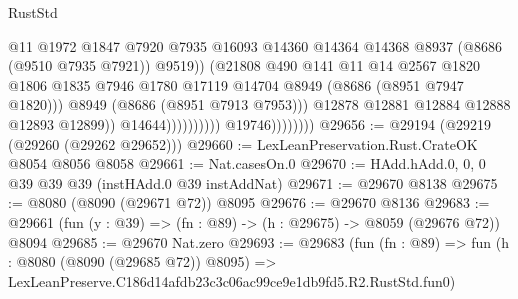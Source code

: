\begin{lexlean}{RustStd}
\begin{coremodule}
                                                  @11
                                                  @1972
                                                  @1847
                                                  @7920
                                                  @7935
                                                  @16093
                                                  @14360
                                                  @14364
                                                  @14368
                                                  @8937
                                                  (@8686 (@9510 @7935 @7921))
                                                  @9519))
                                              (@21808
                                                @490
                                                @141
                                                @11
                                                @14
                                                @2567
                                                @1820
                                                @1806
                                                @1835
                                                @7946
                                                @1780
                                                @17119
                                                @14704
                                                @8949
                                                (@8686 (@8951 @7947 @1820)))
                                              @8949
                                              (@8686 (@8951 @7913 @7953)))
                                            @12878
                                            @12881
                                            @12884
                                            @12888
                                            @12893
                                            @12899))
                                        @14644))))))))))
                    @19746))))))))
@29656 := @29194 (@29219 (@29260 (@29262 @29652)))
@29660 := LexLeanPreservation.Rust.CrateOK @8054 @8056 @8058
@29661 := Nat.casesOn.{0}
@29670 := HAdd.hAdd.{0, 0, 0} @39 @39 @39 (instHAdd.{0} @39 instAddNat)
@29671 := @29670 @8138
@29675 := @8080 (@8090 (@29671 @72)) @8095
@29676 := @29670 @8136
@29683 := @29661 (fun (y : @39) => (fn : @89) -> (h : @29675) -> @8059 (@29676 @72)) @8094
@29685 := @29670 Nat.zero
@29693 := @29683
    (fun (fn : @89) =>
    fun (h : @8080 (@8090 (@29685 @72)) @8095) =>
    LexLeanPreserve.C186d14afdb23c3c06ac99ce9e1db9fd5.R2.RustStd.fun0)

\end{coremodule}
\end{lexlean}
